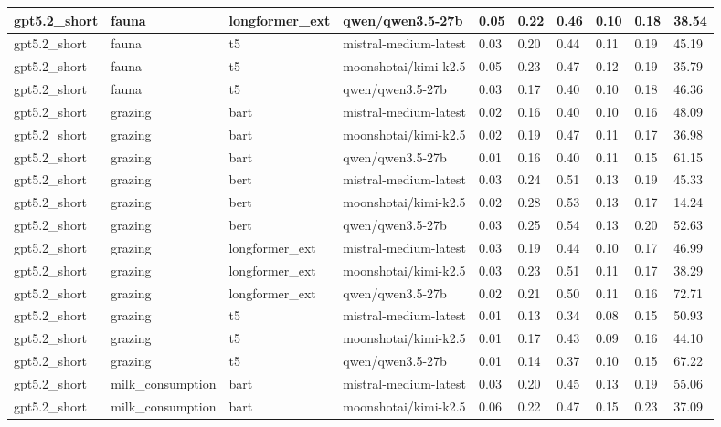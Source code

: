 \begin{tabular}{|l|l|l|l|l|l|l|l|l|l|}
 \hline
 gpt5.2\_short & fauna & longformer\_ext & qwen/qwen3.5-27b & 0.05 & 0.22 & 0.46 & 0.10 & 0.18 & 38.54 \\
 \hline
 gpt5.2\_short & fauna & t5 & mistral-medium-latest & 0.03 & 0.20 & 0.44 & 0.11 & 0.19 & 45.19 \\
 \hline
 gpt5.2\_short & fauna & t5 & moonshotai/kimi-k2.5 & 0.05 & 0.23 & 0.47 & 0.12 & 0.19 & 35.79 \\
 \hline
 gpt5.2\_short & fauna & t5 & qwen/qwen3.5-27b & 0.03 & 0.17 & 0.40 & 0.10 & 0.18 & 46.36 \\
 \hline
 gpt5.2\_short & grazing & bart & mistral-medium-latest & 0.02 & 0.16 & 0.40 & 0.10 & 0.16 & 48.09 \\
 \hline
 gpt5.2\_short & grazing & bart & moonshotai/kimi-k2.5 & 0.02 & 0.19 & 0.47 & 0.11 & 0.17 & 36.98 \\
 \hline
 gpt5.2\_short & grazing & bart & qwen/qwen3.5-27b & 0.01 & 0.16 & 0.40 & 0.11 & 0.15 & 61.15 \\
 \hline
 gpt5.2\_short & grazing & bert & mistral-medium-latest & 0.03 & 0.24 & 0.51 & 0.13 & 0.19 & 45.33 \\
 \hline
 gpt5.2\_short & grazing & bert & moonshotai/kimi-k2.5 & 0.02 & 0.28 & 0.53 & 0.13 & 0.17 & 14.24 \\
 \hline
 gpt5.2\_short & grazing & bert & qwen/qwen3.5-27b & 0.03 & 0.25 & 0.54 & 0.13 & 0.20 & 52.63 \\
 \hline
 gpt5.2\_short & grazing & longformer\_ext & mistral-medium-latest & 0.03 & 0.19 & 0.44 & 0.10 & 0.17 & 46.99 \\
 \hline
 gpt5.2\_short & grazing & longformer\_ext & moonshotai/kimi-k2.5 & 0.03 & 0.23 & 0.51 & 0.11 & 0.17 & 38.29 \\
 \hline
 gpt5.2\_short & grazing & longformer\_ext & qwen/qwen3.5-27b & 0.02 & 0.21 & 0.50 & 0.11 & 0.16 & 72.71 \\
 \hline
 gpt5.2\_short & grazing & t5 & mistral-medium-latest & 0.01 & 0.13 & 0.34 & 0.08 & 0.15 & 50.93 \\
 \hline
 gpt5.2\_short & grazing & t5 & moonshotai/kimi-k2.5 & 0.01 & 0.17 & 0.43 & 0.09 & 0.16 & 44.10 \\
 \hline
 gpt5.2\_short & grazing & t5 & qwen/qwen3.5-27b & 0.01 & 0.14 & 0.37 & 0.10 & 0.15 & 67.22 \\
 \hline
 gpt5.2\_short & milk\_consumption & bart & mistral-medium-latest & 0.03 & 0.20 & 0.45 & 0.13 & 0.19 & 55.06 \\
 \hline
 gpt5.2\_short & milk\_consumption & bart & moonshotai/kimi-k2.5 & 0.06 & 0.22 & 0.47 & 0.15 & 0.23 & 37.09 \\

\end{tabular}

